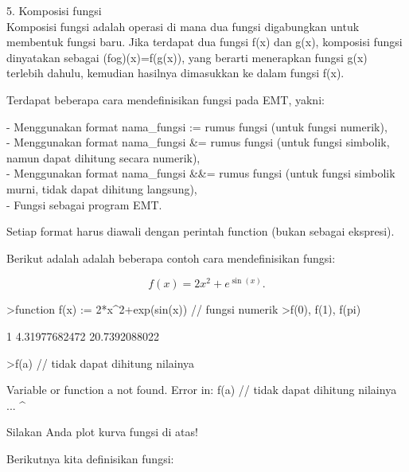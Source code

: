 \documentclass{article}
\begin{document}
\begin{eulernotebook}
\begin{eulercomment}
\begin{eulercomment}
\begin{eulercomment}
5. Komposisi fungsi\\
Komposisi fungsi adalah operasi di mana dua fungsi digabungkan untuk
membentuk fungsi baru. Jika terdapat dua fungsi f(x) dan g(x),
komposisi fungsi dinyatakan sebagai (fog)(x)=f(g(x)), yang berarti
menerapkan fungsi g(x) terlebih dahulu, kemudian hasilnya dimasukkan
ke dalam fungsi f(x).

\end{eulercomment}
\begin{eulercomment}
Terdapat beberapa cara mendefinisikan fungsi pada EMT, yakni:

- Menggunakan format nama\_fungsi := rumus fungsi (untuk fungsi
numerik),\\
- Menggunakan format nama\_fungsi \&= rumus fungsi (untuk fungsi
simbolik, namun dapat dihitung secara numerik),\\
- Menggunakan format nama\_fungsi \&\&= rumus fungsi (untuk fungsi
simbolik murni, tidak dapat dihitung langsung),\\
- Fungsi sebagai program EMT.

Setiap format harus diawali dengan perintah function (bukan sebagai
ekspresi).

Berikut adalah adalah beberapa contoh cara mendefinisikan fungsi:

\end{eulercomment}
\begin{eulerformula}
\[
f(x)=2x^2+e^{\sin(x)}.
\]
\end{eulerformula}
\begin{eulerprompt}
>function f(x) := 2*x^2+exp(sin(x)) // fungsi numerik
>f(0), f(1), f(pi)
\end{eulerprompt}
\begin{euleroutput}
  1
  4.31977682472
  20.7392088022
\end{euleroutput}
\begin{eulerprompt}
>f(a) // tidak dapat dihitung nilainya
\end{eulerprompt}
\begin{euleroutput}
  Variable or function a not found.
  Error in:
  f(a) // tidak dapat dihitung nilainya ...
     ^
\end{euleroutput}
\begin{eulercomment}
Silakan Anda plot kurva fungsi di atas!

Berikutnya kita definisikan fungsi:


\end{eulercomment}
\end{eulercomment}
\end{eulercomment}
\end{eulernotebook}
\end{document}
